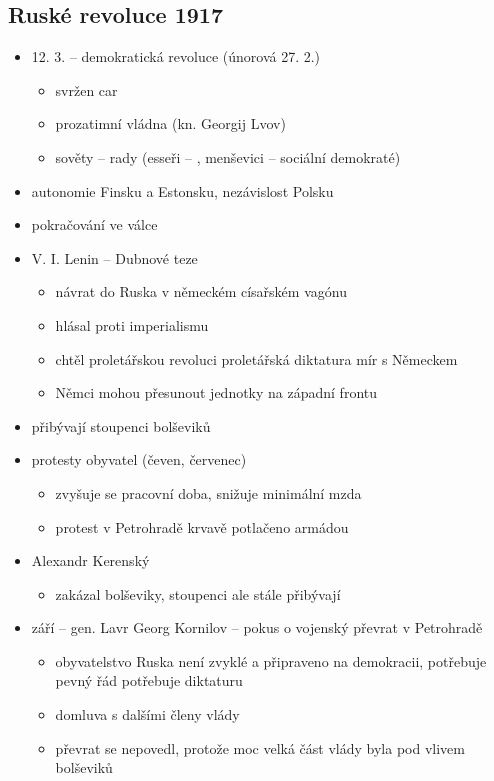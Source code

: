 \subsection{Ruské revoluce 1917}
\begin{itemize}
\item 12. 3. -- demokratická revoluce (únorová 27. 2.)
	\begin{itemize}
	\item svržen car
	\item prozatimní vládna (kn. Georgij Lvov)
	\item sověty -- rady (esseři -- , menševici -- sociální demokraté)
	\end{itemize}
\item autonomie Finsku a Estonsku, nezávislost Polsku
\item pokračování ve válce
\item V. I. Lenin -- Dubnové teze
	\begin{itemize}
	\item návrat do Ruska v německém císařském vagónu
	\item hlásal proti imperialismu
	\item chtěl proletářskou revoluci \ra proletářská diktatura \ra mír s Německem
	\item \ra Němci mohou přesunout jednotky na západní frontu
	\end{itemize}
\item přibývají stoupenci bolševiků
\item protesty obyvatel (čeven, červenec)
	\begin{itemize}
	\item zvyšuje se pracovní doba, snižuje minimální mzda
	\item protest v Petrohradě \ra krvavě potlačeno armádou
	\end{itemize}
\item Alexandr Kerenský
	\begin{itemize}
	\item zakázal bolševiky, stoupenci ale stále přibývají
	\end{itemize}
\item září -- gen. Lavr Georg Kornilov -- pokus o vojenský převrat v Petrohradě
	\begin{itemize}
	\item obyvatelstvo Ruska není zvyklé a připraveno na demokracii, potřebuje pevný řád \ra potřebuje diktaturu
	\item domluva s dalšími členy vlády
	\item převrat se nepovedl, protože moc velká část vlády byla pod vlivem bolševiků
	\end{itemize}
\end{itemize}


